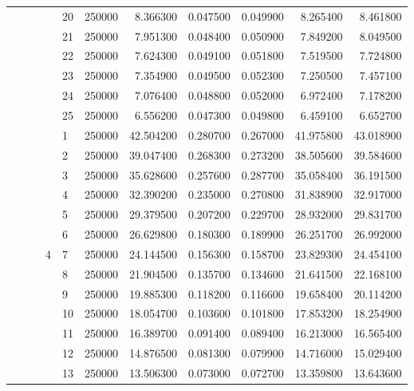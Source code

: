 \begin{tabular}{llllllrrrrr}
\cline{5-11}
 &  &  &  & 20 & 250000 & 8.366300 & 0.047500 & 0.049900 & 8.265400 & 8.461800 \\
\cline{5-11}
 &  &  &  & 21 & 250000 & 7.951300 & 0.048400 & 0.050900 & 7.849200 & 8.049500 \\
\cline{5-11}
 &  &  &  & 22 & 250000 & 7.624300 & 0.049100 & 0.051800 & 7.519500 & 7.724800 \\
\cline{5-11}
 &  &  &  & 23 & 250000 & 7.354900 & 0.049500 & 0.052300 & 7.250500 & 7.457100 \\
\cline{5-11}
 &  &  &  & 24 & 250000 & 7.076400 & 0.048800 & 0.052000 & 6.972400 & 7.178200 \\
\cline{5-11}
 &  &  &  & 25 & 250000 & 6.556200 & 0.047300 & 0.049800 & 6.459100 & 6.652700 \\
\cline{4-11} \cline{5-11}
 &  &  & \multirow[t]{25}{*}{4} & 1 & 250000 & 42.504200 & 0.280700 & 0.267000 & 41.975800 & 43.018900 \\
\cline{5-11}
 &  &  &  & 2 & 250000 & 39.047400 & 0.268300 & 0.273200 & 38.505600 & 39.584600 \\
\cline{5-11}
 &  &  &  & 3 & 250000 & 35.628600 & 0.257600 & 0.287700 & 35.058400 & 36.191500 \\
\cline{5-11}
 &  &  &  & 4 & 250000 & 32.390200 & 0.235000 & 0.270800 & 31.838900 & 32.917000 \\
\cline{5-11}
 &  &  &  & 5 & 250000 & 29.379500 & 0.207200 & 0.229700 & 28.932000 & 29.831700 \\
\cline{5-11}
 &  &  &  & 6 & 250000 & 26.629800 & 0.180300 & 0.189900 & 26.251700 & 26.992000 \\
\cline{5-11}
 &  &  &  & 7 & 250000 & 24.144500 & 0.156300 & 0.158700 & 23.829300 & 24.454100 \\
\cline{5-11}
 &  &  &  & 8 & 250000 & 21.904500 & 0.135700 & 0.134600 & 21.641500 & 22.168100 \\
\cline{5-11}
 &  &  &  & 9 & 250000 & 19.885300 & 0.118200 & 0.116600 & 19.658400 & 20.114200 \\
\cline{5-11}
 &  &  &  & 10 & 250000 & 18.054700 & 0.103600 & 0.101800 & 17.853200 & 18.254900 \\
\cline{5-11}
 &  &  &  & 11 & 250000 & 16.389700 & 0.091400 & 0.089400 & 16.213000 & 16.565400 \\
\cline{5-11}
 &  &  &  & 12 & 250000 & 14.876500 & 0.081300 & 0.079900 & 14.716000 & 15.029400 \\
\cline{5-11}
 &  &  &  & 13 & 250000 & 13.506300 & 0.073000 & 0.072700 & 13.359800 & 13.643600 \\

\end{tabular}
